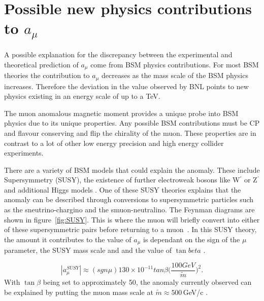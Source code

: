 
\section{Possible new physics contributions to $a_{\mu}$}

A possible explanation for the discrepancy between the experimental and theoretical prediction of $a_{\mu}$ come from BSM physics contributions. For most BSM theories the contribution to $a_{\mu}$ decreases as the mass scale of the BSM physics increases. Therefore the deviation in the value observed by BNL points to new physics existing in an energy scale of up to a TeV.

The muon anomalous magnetic moment provides a unique probe into BSM physics due to its unique properties. Any possible BSM contributions must be CP and flavour conserving and flip the chirality of the muon. These properties are in contrast to a lot of other low energy precision and high energy collider experiments.

There are a variety of BSM models that could explain the anomaly. These include Supersymmetry (SUSY), the existence of further electroweak bosons like W$^\prime$ or Z$^\prime$ and additional Higgs models \cite{Reference1}.
One of these SUSY theories explains that the anomaly can be described through conversions to supersymmetric particles such as the sneutrino-chargino and the smuon-neutralino. The Feynman diagrams are shown in figure~\ref{fig:SUSY}. This is where the muon will briefly convert into either of these supersymmetric pairs before returning to a muon~\cite{Reference30}. In this SUSY theory, the amount it contributes to the value of $a_\mu$ is dependant on the sign of the $\mu$ parameter, the SUSY mass scale and and the value of $\tan{beta}$ \cite{Reference30}.

\begin{equation}
|a_{\mu}^{SUSY}| \approx (sgn\mu) 130\times10^{-11} tan\beta \Big(\frac{100GeV}{\tilde{m}}\Big)^2.
\end{equation}
\noindent
With $\tan{\beta}$ being set to approximately 50, the anomaly currently observed can be explained by putting the muon mass scale at ${\tilde{m}} \approx 500$\,GeV/c \cite{Reference31}\cite{Reference32}. 


